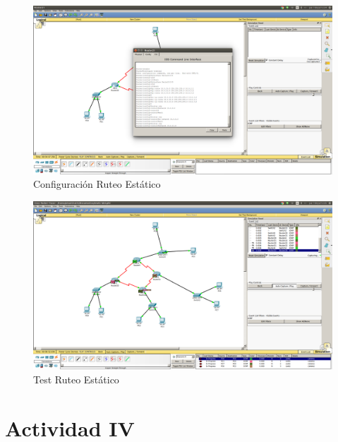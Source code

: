 \documentclass[spanish]{udpreport}
\begin{document}
\begin{figure}[H]
	\centering
	\includegraphics[scale=.25]{imagenes/ruteo_estatico.png}
	\caption{Configuración Ruteo Estático}
	\label{fig:Figura 4.1}
\end{figure}

\begin{figure}[H]
	\centering
	\includegraphics[scale=.25]{imagenes/test_restatico.png}
	\caption{Test Ruteo Estático}
	\label{fig:Figura 4.2}
\end{figure}

\pagebreak 

\section{Actividad IV}
\end{document}
